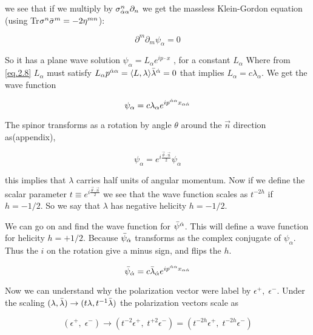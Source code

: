 we see that if we multiply by $\sigma^{n}_{\dot{\alpha} \alpha}\partial_{n}$ we get the massless Klein-Gordon equation (using Tr$ \sigma^{n}\bar{\sigma}^{m}=-2\eta^{mn}$):

\begin{equation}
\partial^{m}\partial_{m} \psi_{\alpha} = 0
\end{equation}

So it has a plane wave solution $\psi_{\alpha} = L_{\alpha} e^{ip \cdot x} $ , for a constant $L_{\alpha}$  Where from \eqref{eq.2.8} $L_{\alpha}$ must satisfy $L_{\alpha}p^{\dot{\alpha} \alpha}= \langle L,\lambda \rangle \bar{\lambda}^{\dot{\alpha}} =  0$ that implies $L_{\alpha} = c \lambda_{\alpha}$. We get the wave function


\begin{equation}
 \psi_{\alpha} = c\lambda_{\alpha}e^{ip^{\dot{\alpha} \alpha} x_{\alpha \dot{\alpha}}}
\end{equation}



 The spinor transforms as a rotation by angle $\theta$ around the $\vec{n}$ direction as(appendix),

\begin{equation}
 \psi_{\alpha} = e^{i\frac{\vec{\theta} \cdot\vec{n}}{2}}\psi_{\alpha}
\end{equation}

this implies that $\lambda$ carries half units of angular momentum. Now if we define the scalar parameter $t \equiv e^{i\frac{\vec{\theta} \cdot\vec{n}}{2}}$ we see that the wave function scales as $t^{-2h}$ if $h = -1/2$. So we say that $\lambda$ has negative helicity  $h = -1/2$.

We can go on and find the wave function for $\bar{\psi}^{\dot{\alpha}}$. This will define a wave function for helicity $h = +1/2$. Because $ \bar{\psi}_{\dot{\alpha}}$ transforms as the complex conjugate of $\psi_{\alpha}$. Thus the $i$ on the rotation give a minus sign, and flips the $h$.

\begin{equation}
 \bar{\psi}_{\dot{\alpha}} = c\bar{\lambda}_{\dot{\alpha}}e^{ip^{\dot{\alpha} \alpha} x_{\alpha \dot{\alpha}}}
\end{equation}


Now we can understand why the polarization vector were label by $\epsilon^{+},\;\epsilon^{-}$. Under the scaling $(\lambda,\bar{\lambda}) \rightarrow( t\lambda,t^{-1}\bar{\lambda}) $ the polarization vectors scale as 

\begin{equation}
(\epsilon^{+},\;\epsilon^{-}) \rightarrow (t^{-2}\epsilon^{+},\;t^{+2}\epsilon^{-}) = (t^{-2h}\epsilon^{+},\;t^{-2h}\epsilon^{-})  
\end{equation}


